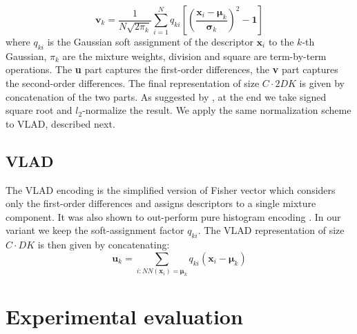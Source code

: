 \documentclass[10pt,twocolumn,letterpaper]{article}
\begin{document}
\begin{equation}
\label{eq:fv_vk}
\textbf{v}_k=\frac{1}{N\sqrt{2\pi_k}}\sum_{i=1}^{N}q_{ki}\left[\left(\frac{\textbf{x}_i-\boldsymbol\mu_k}{\boldsymbol\sigma_k}\right)^2-\textbf{1}\right]
\end{equation}
where $q_{ki}$ is the Gaussian soft assignment of the descriptor $\textbf{x}_i$ to the $k$-th Gaussian, $\pi_k$ are the mixture weights, division and square are term-by-term operations. The \textbf{u} part captures the first-order differences, the \textbf{v} part captures the second-order differences. The final representation of size $C\cdot 2DK$ is given by concatenation of the two parts. As suggested by \cite{Perronnin10}, at the end we take signed square root and $l_2$-normalize the result. We apply the same normalization scheme to VLAD, described next.
\subsection{VLAD}
\label{subsec:vladenc}
The VLAD encoding is the simplified version of Fisher vector which considers only the first-order differences and assigns descriptors to a single mixture component. It was also shown to out-perform pure histogram encoding \cite{Jegou12}. In our variant we keep the soft-assignment factor $q_{ki}$. The VLAD representation of size $C\cdot DK$ is then given by concatenating:$$\textbf{u}_k=\sum_{i : NN\left(\textbf{x}_i\right)=\boldsymbol\mu_k}q_{ki}\left(\textbf{x}_i -\boldsymbol\mu_k\right)$$


\section{Experimental evaluation}
\label{sec:experiments}
\end{document}
